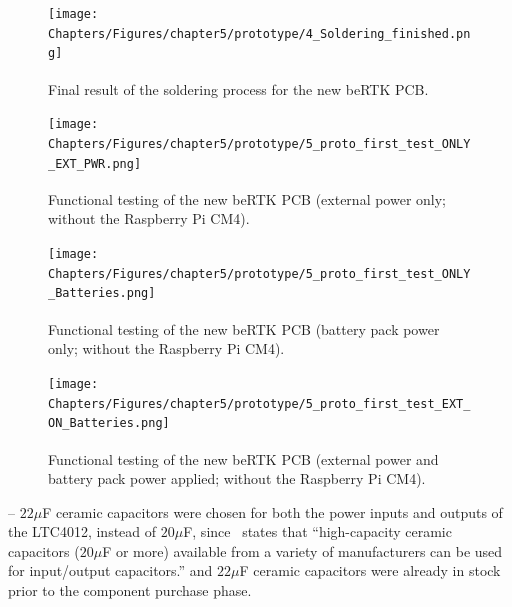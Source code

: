 \begin{figure}[h]
	\centering
	\texttt{[image: Chapters/Figures/chapter5/prototype/4\_Soldering\_finished.png]}
	\caption{Final result of the soldering process for the new beRTK\textsuperscript{\textregistered} PCB.}
	\label{fig:4_Soldering_finished}
\end{figure}%

\begin{figure}[h]
	\centering
	\texttt{[image: Chapters/Figures/chapter5/prototype/5\_proto\_first\_test\_ONLY\_EXT\_PWR.png]}
	\caption{Functional testing of the new beRTK\textsuperscript{\textregistered} PCB (external power only; without the Raspberry Pi CM4).}
	\label{fig:5_proto_first_test_ONLY_EXT_PWR}
\end{figure}%

\begin{figure}[h]
	\centering
	\texttt{[image: Chapters/Figures/chapter5/prototype/5\_proto\_first\_test\_ONLY\_Batteries.png]}
	\caption{Functional testing of the new beRTK\textsuperscript{\textregistered} PCB (battery pack power only; without the Raspberry Pi CM4).}
	\label{fig:5_proto_first_test_ONLY_Batteries}
\end{figure}%

\begin{figure}[h]
	\centering
	\texttt{[image: Chapters/Figures/chapter5/prototype/5\_proto\_first\_test\_EXT\_ON\_Batteries.png]}
	\caption{Functional testing of the new beRTK\textsuperscript{\textregistered} PCB (external power and battery pack power applied; without the Raspberry Pi CM4).}
	\label{fig:5_proto_first_test_EXT_ON_Batteries}
\end{figure}%



-- $22 \mu$F ceramic capacitors were chosen for both the power inputs and outputs of the LTC4012, instead of $20 \mu$F, since~\cite{LTC4012} states that ``high-capacity ceramic capacitors ($20 \mu$F or more) available from a variety of manufacturers can be used for input/output capacitors.'' %
and $22 \mu$F ceramic capacitors were already in stock prior to the component purchase phase.

